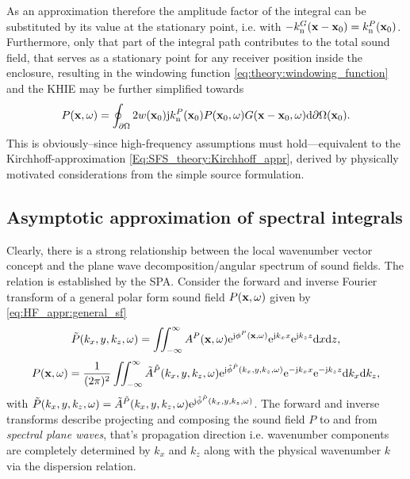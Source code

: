 As an approximation therefore the amplitude factor of the integral can be substituted by its value at the stationary point, i.e. with $- k_{\mathrm{n}}^G(\mathbf{x}-\mathbf{x}_0) = k_{\mathrm{n}}^P(\mathbf{x}_0)$.
Furthermore, only that part of the integral path contributes to the total sound field, that serves as a stationary point for any receiver position inside the enclosure,
resulting in the windowing function \eqref{eq:theory:windowing_function} and the KHIE may be further simplified towards
\begin{equation}
P(\mathbf{x},\omega) = 
\oint_{\partial \Omega} 
2 w(\mathbf{x}_0) \mathrm{j} k_{\mathrm{n}}^P(\mathbf{x}_0) 
P(\mathbf{x}_0,\omega) G(\mathbf{x}-\mathbf{x}_0,\omega)  \mathrm{d} \partial \Omega( \mathbf{x}_0).
\label{Eq:HF_appr:Kirchhoff_approximation}
\end{equation}
This is obviously--since high-frequency assumptions must hold---equivalent to the Kirchhoff-approximation \eqref{Eq:SFS_theory:Kirchhoff_appr}, derived by physically motivated considerations from the simple source formulation.

\subsection{Asymptotic approximation of spectral integrals}
\label{Sec:SPA_for_Fourier}
Clearly, there is a strong relationship between the local wavenumber vector concept and the plane wave decomposition/angular spectrum of sound fields.
The relation is established by the SPA.
Consider the forward and inverse Fourier transform of a general polar form sound field $P(\mathbf{x},\omega)$ given by \eqref{eq:HF_appr:general_sf}
\begin{equation}
\tilde{P}(k_x,y,k_z,\omega) = \iint_{-\infty}^{\infty} A^P(\mathbf{x},\omega)\mathrm{e}^{\mathrm{j} \phi^P(\mathbf{x},\omega)} \mathrm{e}^{\mathrm{j} k_x x} \mathrm{e}^{\mathrm{j} k_z z} \mathrm{d} x \mathrm{d} z,
\label{eq:forward_transform}
\end{equation}
\begin{equation}
P(\mathbf{x},\omega) = \frac{1}{(2\pi)^2} \iint_{-\infty}^{\infty} \tilde{A}^{\tilde{P}}(k_x,y,k_z,\omega)\mathrm{e}^{\mathrm{j} \tilde{\phi}^{\tilde{P}}(k_x,y,k_z,\omega)}  \mathrm{e}^{-\mathrm{j} k_x x} \mathrm{e}^{-\mathrm{j} k_z z} \mathrm{d} k_x \mathrm{d} k_z,
\label{eq:inverse_transform}
\end{equation}
with $\tilde{P}(k_x,y,k_z,\omega) =\tilde{A}^{\tilde{P}}(k_x,y,k_z,\omega)\mathrm{e}^{\mathrm{j} \tilde{\phi}^{\tilde{P}}(k_x,y,k_z,\omega)}$.
The forward and inverse transforms describe projecting and composing the sound field $P$ to and from \emph{spectral plane waves}, that's propagation direction i.e. wavenumber components are completely determined by $k_x$ and $k_z$ along with the physical wavenumber $k$ via the dispersion relation.

